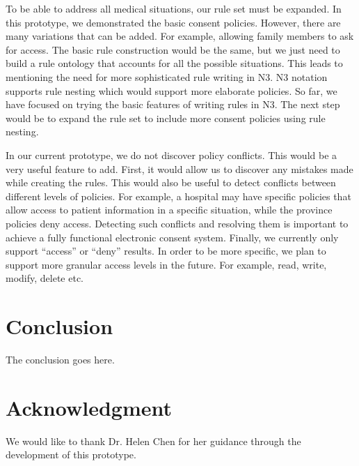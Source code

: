\documentclass[conference]{IEEEtran}
\begin{document}
To be able to address all medical situations, our rule set must be expanded. In this prototype, we demonstrated the basic consent policies. However, there are
many variations that can be added. For example, allowing family members to ask for access. The basic rule construction would be the same, but we just need to
build a rule ontology that accounts for all the possible situations. This leads to mentioning the need for more sophisticated rule writing in N3. N3
notation supports rule nesting which would support more elaborate policies. So far, we have focused on trying the basic features of writing
rules in N3. The next step would be to expand the rule set to include more consent policies using rule nesting.

In our current prototype, we do not discover policy conflicts. This would be a very useful feature to add. First, it would allow us to discover any mistakes
made while creating the rules. This would also be useful to detect conflicts between different levels of policies. For example, a hospital may have specific
policies that allow access to patient information in a specific situation, while the province policies deny access. Detecting such conflicts and resolving them
is important to achieve a fully functional electronic consent system. Finally, we currently only support ``access'' or ``deny'' results. In order to be more
specific, we plan to support more granular access levels in the future. For example, read, write, modify, delete etc.

\section{Conclusion}
\label{concl}
The conclusion goes here.






\section*{Acknowledgment}


We would like to thank Dr. Helen Chen for her guidance through the development of this prototype.  









\appendices
\end{document}

